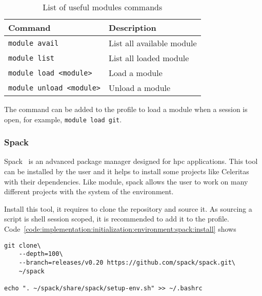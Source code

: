 \begin{table}[ht]
    \centering
    \begin{tabular}{|l|l|}
        \hline
        \textbf{Command} & \textbf{Description} \\
        \hline
        \texttt{module avail} & List all available module \\
        \hline
        \texttt{module list} & List all loaded module \\
        \hline
        \texttt{module load <module>} & Load a module \\
        \hline
        \texttt{module unload <module>} & Unload a module \\
        \hline
    \end{tabular}
    \caption{List of useful modules commands}
    \label{tab:implementation:initialization:environment:module:commands}
\end{table}

The command can be added to the profile to load a module when a session is open,
for example, \texttt{module load git}.


\subsubsection{Spack}
\label{ch:implementation:initialization:environment:spack}

Spack~\cite{Spack} is an advanced package manager designed for \acrshort{hpc} applications.
This tool can be installed by the user and it helps to install some projects like
Celeritas with their dependencies.
Like module, spack allows the user to work on many different projects with the
system of the environment.

Install this tool, it requires to clone the repository and source it.
As sourcing a script is shell session scoped, it is recommended to add it to the
profile.
Code~\ref{code:implementation:initialization:environment:spack:install} shows

\begin{code}
    \label{code:implementation:initialization:environment:spack:install}
    \begin{verbatim}
git clone\
    --depth=100\
    --branch=releases/v0.20 https://github.com/spack/spack.git\
    ~/spack

echo ". ~/spack/share/spack/setup-env.sh" >> ~/.bashrc
    \end{verbatim}
\end{code}

